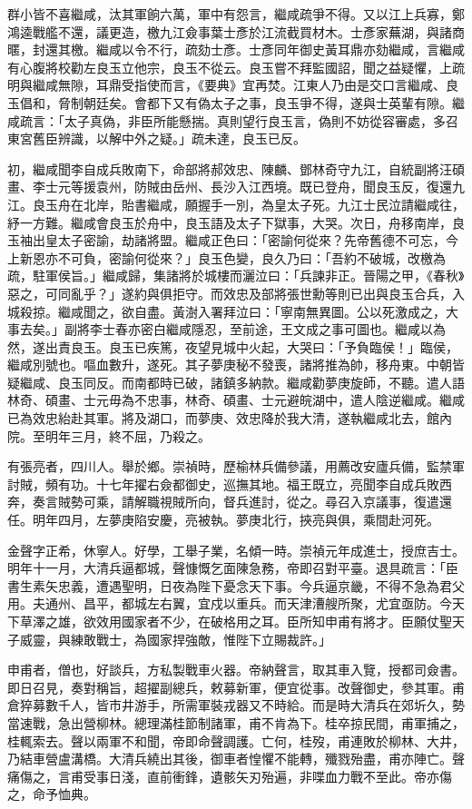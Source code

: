 \begin{pinyinscope}
{{群小皆不喜繼咸，汰其軍餉六萬，軍中有怨言，繼咸疏爭不得。又以江上兵寡，鄭鴻逵戰艦不還，議更造，檄九江僉事葉士彥於江流截買材木。士彥家蕪湖，與諸商暱，封還其檄。繼咸以令不行，疏劾士彥。士彥同年御史黃耳鼎亦劾繼咸，言繼咸有心腹將校勸左良玉立他宗，良玉不從云。良玉嘗不拜監國詔，聞之益疑懼，上疏明與繼咸無隙，耳鼎受指使而言，《要典》宜再焚。江東人乃由是交口言繼咸、良玉倡和，脅制朝廷矣。會都下又有偽太子之事，良玉爭不得，遂與士英輩有隙。繼咸疏言：「太子真偽，非臣所能懸揣。真則望行良玉言，偽則不妨從容審處，多召東宮舊臣辨識，以解中外之疑。」疏未達，良玉已反。

初，繼咸聞李自成兵敗南下，命部將郝效忠、陳麟、鄧林奇守九江，自統副將汪碩畫、李士元等援袁州，防賊由岳州、長沙入江西境。既已登舟，聞良玉反，復還九江。良玉舟在北岸，貽書繼咸，願握手一別，為皇太子死。九江士民泣請繼咸往，紓一方難。繼咸會良玉於舟中，良玉語及太子下獄事，大哭。次日，舟移南岸，良玉袖出皇太子密諭，劫諸將盟。繼咸正色曰：「密諭何從來？先帝舊德不可忘，今上新恩亦不可負，密諭何從來？」良玉色變，良久乃曰：「吾約不破城，改檄為疏，駐軍侯旨。」繼咸歸，集諸將於城樓而灑泣曰：「兵諫非正。晉陽之甲，《春秋》惡之，可同亂乎？」遂約與俱拒守。而效忠及部將張世勳等則已出與良玉合兵，入城殺掠。繼咸聞之，欲自盡。黃澍入署拜泣曰：「寧南無異圖。公以死激成之，大事去矣。」副將李士春亦密白繼咸隱忍，至前途，王文成之事可圖也。繼咸以為然，遂出責良玉。良玉已疾篤，夜望見城中火起，大哭曰：「予負臨侯！」臨侯，繼咸別號也。嘔血數升，遂死。其子夢庚秘不發喪，諸將推為帥，移舟東。中朝皆疑繼咸、良玉同反。而南都時已破，諸鎮多納款。繼咸勸夢庚旋師，不聽。遣人語林奇、碩畫、士元毋為不忠事，林奇、碩畫、士元避皖湖中，遣人陰逆繼咸。繼咸已為效忠紿赴其軍。將及湖口，而夢庚、效忠降於我大清，遂執繼咸北去，館內院。至明年三月，終不屈，乃殺之。

有張亮者，四川人。舉於鄉。崇禎時，歷榆林兵備參議，用薦改安廬兵備，監禁軍討賊，頻有功。十七年擢右僉都御史，巡撫其地。福王既立，亮聞李自成兵敗西奔，奏言賊勢可乘，請解職視賊所向，督兵進討，從之。尋召入京議事，復遣還任。明年四月，左夢庚陷安慶，亮被執。夢庚北行，挾亮與俱，乘間赴河死。

金聲字正希，休寧人。好學，工舉子業，名傾一時。崇禎元年成進士，授庶吉士。明年十一月，大清兵逼都城，聲慷慨乞面陳急務，帝即召對平臺。退具疏言：「臣書生素矢忠義，遭遇聖明，日夜為陛下憂念天下事。今兵逼京畿，不得不急為君父用。夫通州、昌平，都城左右翼，宜戍以重兵。而天津漕艘所聚，尤宜亟防。今天下草澤之雄，欲效用國家者不少，在破格用之耳。臣所知申甫有將才。臣願仗聖天子威靈，與練敢戰士，為國家捍強敵，惟陛下立賜裁許。」

申甫者，僧也，好談兵，方私製戰車火器。帝納聲言，取其車入覽，授都司僉書。即日召見，奏對稱旨，超擢副總兵，敕募新軍，便宜從事。改聲御史，參其軍。甫倉猝募數千人，皆市井游手，所需軍裝戎器又不時給。而是時大清兵在郊圻久，勢當速戰，急出營柳林。總理滿桂節制諸軍，甫不肯為下。桂卒掠民間，甫軍捕之，桂輒索去。聲以兩軍不和聞，帝即命聲調護。亡何，桂歿，甫連敗於柳林、大井，乃結車營盧溝橋。大清兵繞出其後，御車者惶懼不能轉，殲戮殆盡，甫亦陣亡。聲痛傷之，言甫受事日淺，直前衝鋒，遺骸矢刃殆遍，非喋血力戰不至此。帝亦傷之，命予恤典。

}}
\end{pinyinscope}
